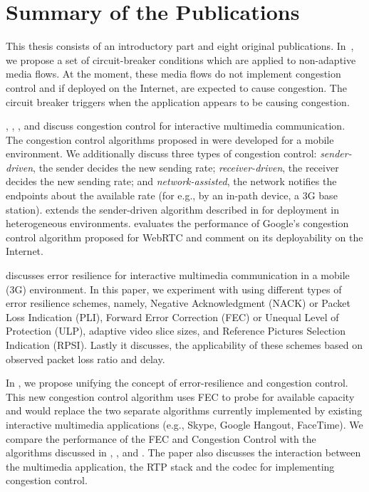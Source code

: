 \section{Summary of the Publications}

This thesis consists of an introductory part and eight original publications.
In~, we propose a set of circuit-breaker conditions which are
applied to non-adaptive media flows. At the moment, these media flows do not
implement congestion control and if deployed on the Internet, are expected to
cause congestion. The circuit breaker triggers when the application appears to
be causing congestion.

, , , and 
discuss congestion control for interactive multimedia communication. The
congestion control algorithms proposed in  were developed for
a mobile environment. We additionally discuss three types of congestion
control:  \emph{sender-driven}, the sender decides the new sending rate; 
\emph{receiver-driven}, the receiver decides the new sending rate; and 
\emph{network-assisted}, the network notifies the endpoints about the available
rate (for e.g., by an in-path device, a 3G base station). 
extends the sender-driven algorithm described in  for
deployment in heterogeneous environments.  evaluates the
performance of Google's congestion control algorithm proposed for WebRTC and
comment on its deployability on the Internet.

 discusses error resilience for interactive multimedia
communication in a mobile (3G) environment. In this paper, we experiment with
using different types of error resilience schemes, namely, Negative
Acknowledgment (NACK) or Packet Loss Indication (PLI), Forward Error
Correction (FEC) or Unequal Level of Protection (ULP), adaptive video slice
sizes, and Reference Pictures Selection Indication (RPSI). Lastly it
discusses, the applicability of these schemes based on observed packet loss
ratio and delay.

In , we propose unifying the concept of error-resilience and
congestion control. This new congestion control algorithm uses FEC to probe
for available capacity and would replace the two separate algorithms currently
implemented by existing interactive multimedia applications (e.g., Skype,
Google Hangout, FaceTime). We compare the performance of the FEC and
Congestion Control with the algorithms discussed in ,
, and . The paper also discusses the
interaction between the multimedia application, the RTP stack and the codec
for implementing congestion control.


